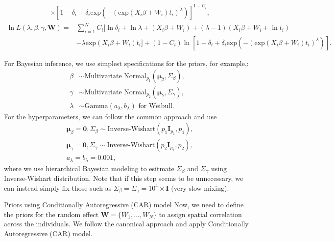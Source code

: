 \documentclass[a4paper, 12pt]{article}
\makeatletter
\newcommand {\dsum}{\displaystyle \sum}
\renewcommand{\section}{\@startsection
	{section}    {1}    {0mm}    {-0.7\baselineskip}    {0.08\baselineskip}    {\normalfont\large\sc\center\bf}}
\makeatother
\begin{document}
\begin{itemize}
\begin{equation}
\begin{aligned}
	&\times [1-\delta _{i}+\delta_i \mbox{exp}(-(\mbox{exp}(X_i{\beta}+W_i)t_i)^{\lambda})]^{1-C_{i}},
	\end{aligned}
	\end{equation}
	\begin{equation}
	\begin{aligned}
	\ln L(\lambda, {\beta}, {\gamma}, \mathbf{W})=&\dsum\limits_{i=1}^{N}C_i [\ln\delta _{i}+ \ln\lambda+(X_i{\beta}+ W_i) + (\lambda-1)(X_i{\beta}+ W_i+ \ln t_i)\\&- \lambda\mbox{exp}(X_i{\beta}+ W_i)t_i]+(1-C_i)\ln[1-\delta _{i}+\delta_i \mbox{exp}(-(\mbox{exp}(X_i{\beta}+W_i)t_i)^{\lambda})].		
	\end{aligned}
	\end{equation}
\end{itemize}
For Bayesian inference, we use simplest specifications for the priors, for example,:
\begin{equation}
\begin{aligned}
{\beta} &\sim \mbox{Multivariate Normal}_{p_1}(\mathbf{\mu}_{\beta}, \Sigma_{\beta}),\\
{\gamma} &\sim \mbox{Multivariate Normal}_{p_2}(\mathbf{\mu}_{\gamma}, \Sigma_{\gamma}),\\
\lambda &\sim \mbox{Gamma}(a_{\lambda}, b_{\lambda}) \mbox{ for Weibull}.
\end{aligned}
\end{equation}
For the hyperparameters, we can follow the common approach and use
\begin{equation}
\begin{aligned}
&\mathbf{\mu}_{\beta} = \mathbf{0}, \Sigma_{\beta} \sim \mbox{Inverse-Wishart}(p_1\mathbf{I}_{p_1}, p_1),\\
& \mathbf{\mu}_{\gamma} = \mathbf{0}, \Sigma_{\gamma} \sim \mbox{Inverse-Wishart}(p_2\mathbf{I}_{p_2}, p_2), \\
& a_{\lambda} =  b_{\lambda} = 0.001,
\end{aligned}
\end{equation}
where we use hierarchical Bayesian modeling to esitmate $\Sigma_{\beta}$ and $\Sigma_{\gamma}$ using Inverse-Wishart distribution. Note that if this step seems to be unnecessary, we can instead simply fix those such as $\Sigma_{\beta} =\Sigma_{\gamma} = 10^4\times\mathbf{I}$ (very slow mixing). 
\section{Priors using Conditionally Autoregressive (CAR) model}
\noindent Now, we need to define the priors for the random effect $\mathbf{W}=\{W_1,...,W_N\}$ to assign spatial correlation across the individuals. We follow the canonical approach and apply Conditionally Autoregressive (CAR) model.
\end{document}
